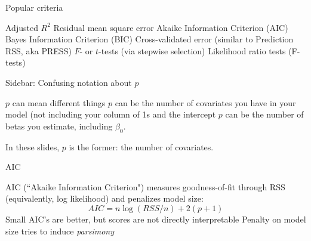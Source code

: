 
\begin{frame}{Popular criteria}

\bi
        \myitem Adjusted $R^2$
        \myitem Residual mean square error
        \myitem Akaike Information Criterion (AIC)
        \myitem Bayes Information Criterion (BIC)
    	\myitem Cross-validated error (similar to Prediction RSS, aka PRESS)
        \myitem $F$- or $t$-tests (via stepwise selection)
        \myitem Likelihood ratio tests (F-tests)
\ei

\end{frame}



\begin{frame}{Sidebar: Confusing notation about $p$}

\begin{block}{$p$ can mean different things}
\bi
        \myitem $p$ can be the number of covariates you have in your model (not including your column of 1s and the intercept
        \myitem $p$ can be the number of betas you estimate, including $\beta_0$. 
\ei

In these slides, $p$ is the former: the number of covariates.

\end{block}

\end{frame}


\begin{frame}{AIC}

AIC (``Akaike Information Criterion") measures goodness-of-fit through RSS (equivalently, log likelihood) and penalizes model size:
$$ AIC = n \log(RSS/n) + 2(p+1) $$
\bi
        \myitem Small AIC's are better, but scores are not directly interpretable
        \myitem Penalty on model size tries to induce {\it parsimony}
\ei

\end{frame}




